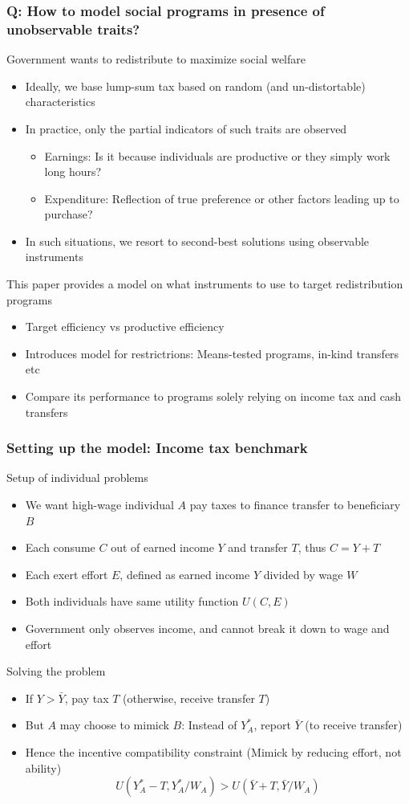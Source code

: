 \documentclass[aspectratio=169]{beamer}
\begin{document}
\begin{frame}
\frametitle{Q: How to model social programs in presence of unobservable traits? } 
Government wants to redistribute to maximize social welfare
\begin{itemize}\setlength\itemsep{3pt}
\item Ideally, we base lump-sum tax based on random (and un-distortable) characteristics
\item In practice, only the partial indicators of such traits are observed
\begin{itemize}\setlength\itemsep{3pt}
\item Earnings: Is it because individuals are productive or they simply work long hours?
\item Expenditure: Reflection of true preference or other factors leading up to purchase?
\end{itemize}
\item In such situations, we resort to second-best solutions using observable instruments
\end{itemize}\medskip
This paper provides a model on what instruments to use to target redistribution programs
\begin{itemize}\setlength\itemsep{3pt}
\item Target efficiency vs productive efficiency
\item Introduces model for restrictrions: Means-tested programs, in-kind transfers etc
\item Compare its performance to programs solely relying on income tax and cash transfers
 \end{itemize}
\end{frame}

\begin{frame}
\frametitle{Setting up the model: Income tax benchmark} 
Setup of individual problems
\begin{itemize}\setlength\itemsep{3pt}
\item We want high-wage individual $A$ pay taxes to finance transfer to beneficiary $B$
\item Each consume $C$ out of earned income $Y$ and transfer $T$, thus $C=Y+T$
\item Each exert effort $E$, defined as earned income $Y$ divided by wage $W$
\item Both individuals have same utility function $U(C,E)$
\item Government only observes income, and cannot break it down to wage and effort
\end{itemize}\medskip
Solving the problem
\begin{itemize}\setlength\itemsep{3pt}
\item If $Y > \bar{Y}$, pay tax $T$ (otherwise, receive transfer $T$)
\item But $A$ may choose to mimick $B$: Instead of $Y_A^*$, report $\bar{Y}$ (to receive transfer)
\item Hence the incentive compatibility constraint (Mimick by reducing effort, not ability)
\[
U(Y_A^*-T, Y_A^*/W_A)> U(\bar{Y}+T, \bar{Y}/W_A)
\]
\end{itemize}
\end{frame}
\end{document}
